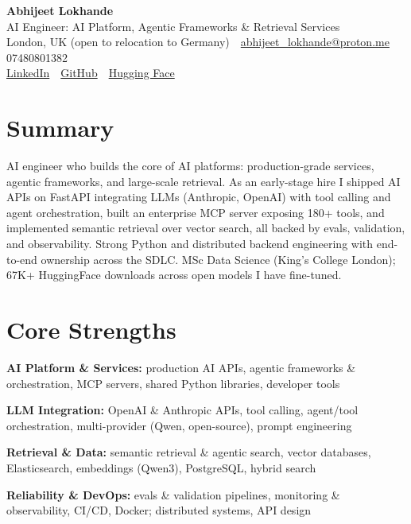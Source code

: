 \documentclass[10pt,a4paper]{article}
\newcommand{\sep}{\,\textcolor{accent!60}{\textbar}\,}
\begin{document}
\begin{center}
  {\fontsize{24}{26}\selectfont\bfseries Abhijeet Lokhande}\\[3pt]
  {\color{accent}\large AI Engineer: AI Platform, Agentic Frameworks \& Retrieval Services}\\[5pt]
  {\small
    London, UK (open to relocation to Germany) \sep
    \href{mailto:abhijeet_lokhande@proton.me}{abhijeet\_lokhande@proton.me} \sep
    07480801382 \\[2pt]
    \href{https://www.linkedin.com/in/ablds/}{LinkedIn} \sep
    \href{https://github.com/abhijeetscode}{GitHub} \sep
    \href{https://huggingface.co/ab-ai}{Hugging Face}
  }
\end{center}
\vspace{2pt}

\section{Summary}
AI engineer who builds the core of AI platforms: production-grade services, agentic frameworks, and large-scale retrieval. As an early-stage hire I shipped AI APIs on FastAPI integrating LLMs (Anthropic, OpenAI) with tool calling and agent orchestration, built an enterprise MCP server exposing 180+ tools, and implemented semantic retrieval over vector search, all backed by evals, validation, and observability. Strong Python and distributed backend engineering with end-to-end ownership across the SDLC. MSc Data Science (King's College London); 67K+ HuggingFace downloads across open models I have fine-tuned.

\section{Core Strengths}
\begin{tight}
  \item[\textcolor{accent}{\small$\bullet$}] \textbf{AI Platform \& Services:} production AI APIs, agentic frameworks \& orchestration, MCP servers, shared Python libraries, developer tools
  \item[\textcolor{accent}{\small$\bullet$}] \textbf{LLM Integration:} OpenAI \& Anthropic APIs, tool calling, agent/tool orchestration, multi-provider (Qwen, open-source), prompt engineering
  \item[\textcolor{accent}{\small$\bullet$}] \textbf{Retrieval \& Data:} semantic retrieval \& agentic search, vector databases, Elasticsearch, embeddings (Qwen3), PostgreSQL, hybrid search
  \item[\textcolor{accent}{\small$\bullet$}] \textbf{Reliability \& DevOps:} evals \& validation pipelines, monitoring \& observability, CI/CD, Docker; distributed systems, API design
\end{tight}
\end{document}
